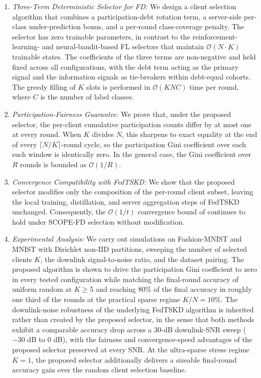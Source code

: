 \documentclass[journal]{IEEEtran}
\begin{document}
\begin{enumerate}
    \item \textit{Three-Term Deterministic Selector for FD:} We design a client selection algorithm that combines a participation-debt rotation term, a server-side per-class under-prediction bonus, and a per-round class-coverage penalty. The selector has zero trainable parameters, in contrast to the reinforcement-learning- and neural-bandit-based FL selectors that maintain $\mathcal{O}(N\cdot K)$ trainable states. The coefficients of the three terms are non-negative and held fixed across all configurations, with the debt term acting as the primary signal and the information signals as tie-breakers within debt-equal cohorts. The greedy filling of $K$ slots is performed in $\mathcal{O}(KNC)$ time per round, where $C$ is the number of label classes.

    \item \textit{Participation-Fairness Guarantee:} We prove that, under the proposed selector, the per-client cumulative participation counts differ by at most one at every round. When $K$ divides $N$, this sharpens to exact equality at the end of every $\lceil N/K \rceil$-round cycle, so the participation Gini coefficient over each such window is identically zero. In the general case, the Gini coefficient over $R$ rounds is bounded as $\mathcal{O}(1/R)$.

    \item \textit{Convergence Compatibility with FedTSKD:} We show that the proposed selector modifies only the composition of the per-round client subset, leaving the local training, distillation, and server aggregation steps of FedTSKD \cite{mu2024fedtskd} unchanged. Consequently, the $\mathcal{O}(1/t)$ convergence bound of \cite{mu2024fedtskd} continues to hold under SCOPE-FD selection without modification.

    \item \textit{Experimental Analysis:} We carry out simulations on Fashion-MNIST and MNIST with Dirichlet non-IID partitions, sweeping the number of selected clients $K$, the downlink signal-to-noise ratio, and the dataset pairing. The proposed algorithm is shown to drive the participation Gini coefficient to zero in every tested configuration while matching the final-round accuracy of uniform random at $K \ge 5$ and reaching $80\%$ of the final accuracy in roughly one third of the rounds at the practical sparse regime $K/N = 10\%$. The downlink-noise robustness of the underlying FedTSKD algorithm is inherited rather than created by the proposed selector, in the sense that both methods exhibit a comparable accuracy drop across a $30$-dB downlink-SNR sweep ($-30$ dB to $0$ dB), with the fairness and convergence-speed advantages of the proposed selector preserved at every SNR. At the ultra-sparse stress regime $K = 1$, the proposed selector additionally delivers a sizeable final-round accuracy gain over the random client selection baseline.
\end{enumerate}
\end{document}
